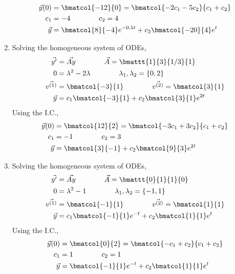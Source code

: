 \begin{enumerate}
\begin{align}
    \vec{y}(0) & = \bmatcol{-12}{0} = \bmatcol{-2c_1 - 5c_2}{c_1 + c_2} \\
    c_1        & = -4 \qquad\qquad c_2 = 4                              \\
    \vec{y}    & = \bmatcol{8}{-4}e^{-0.5t}
    + c_2\bmatcol{-20}{4}e^{t}
\end{align}
\item Solving the homogeneous system of ODEs,
\begin{align}
    \vec{y'}      & = \vec{Ay}
    \qquad\qquad
    \vec{A}                           = \bmattt{1}{3}{1/3}{1} \\
    0             & = \lambda^{2} - 2\lambda
    \qquad\qquad
    \lambda_1, \lambda_2              = \left\{ 0, 2 \right\} \\
    \vec{v^{(1)}} & = \bmatcol{-3}{1}
    \qquad\qquad
    \vec{v^{(2)}} = \bmatcol{3}{1}                            \\
    \vec{y}       & = c_1 \bmatcol{-3}{1}
    + c_2\bmatcol{3}{1}e^{2t}
\end{align}
Using the I.C.,
\begin{align}
    \vec{y}(0) & = \bmatcol{12}{2} = \bmatcol{-3c_1 + 3c_2}{c_1 + c_2} \\
    c_1        & = -1 \qquad\qquad c_2 = 3                             \\
    \vec{y}    & = \bmatcol{3}{-1}
    + c_2\bmatcol{9}{3}e^{2t}
\end{align}
\item Solving the homogeneous system of ODEs,
\begin{align}
    \vec{y'}      & = \vec{Ay}
    \qquad\qquad
    \vec{A}                           = \bmattt{0}{1}{1}{0}    \\
    0             & = \lambda^{2} - 1
    \qquad\qquad
    \lambda_1, \lambda_2              = \left\{ -1, 1 \right\} \\
    \vec{v^{(1)}} & = \bmatcol{-1}{1}
    \qquad\qquad
    \vec{v^{(2)}} = \bmatcol{1}{1}                             \\
    \vec{y}       & = c_1 \bmatcol{-1}{1}e^{-t}
    + c_2\bmatcol{1}{1}e^{t}
\end{align}
Using the I.C.,
\begin{align}
    \vec{y}(0) & = \bmatcol{0}{2} = \bmatcol{-c_1 + c_2}{c_1 + c_2} \\
    c_1        & = 1 \qquad\qquad c_2 = 1                           \\
    \vec{y}    & = \bmatcol{-1}{1}e^{-t}
    + c_2\bmatcol{1}{1}e^{t}

\end{align}
\end{enumerate}
